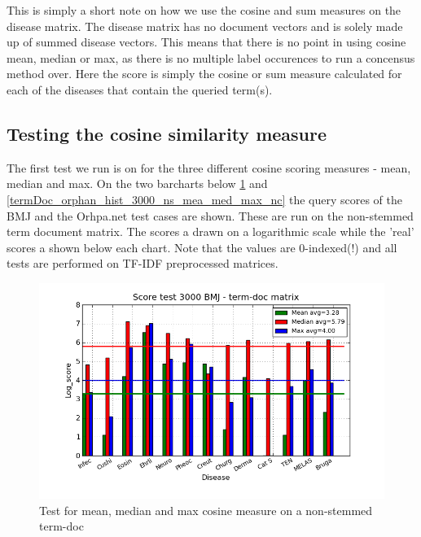 This is simply a short note on how we use the cosine and sum measures
on the disease matrix. The disease matrix has no document vectors and
is solely made up of summed disease vectors. This means that there is
no point in using cosine mean, median or max, as there is no multiple
label occurences to run a concensus method over. Here the score is
simply the cosine or sum measure calculated for each of the diseases
that contain the queried term(s).

\subsection{Testing the cosine similarity measure\label{TestingCosineSimilarity}}

The first test we run is on for the three different cosine scoring measures - mean, 
median and max. On the two barcharts below \ref{termDoc_bmj_hist_3000_ns_mea_med_max_nc} 
and \ref{termDoc_orphan_hist_3000_ns_mea_med_max_nc} the query scores of the BMJ 
and the Orhpa.net test cases are shown. These are run on the non-stemmed term document matrix. 
The scores a drawn on a logarithmic scale while the 'real' scores a shown below each chart. 
Note that the values are 0-indexed(!) and all tests are performed on TF-IDF preprocessed matrices. \\

\begin{figure}[H]
        \begin{center}
          \includegraphics[width=1.0\textwidth]{barcharts/termDoc_bmj_hist_3000_ns_mea_med_max_nc.png}
        \end{center}
        \caption{Test for mean, median and max cosine measure on a non-stemmed term-doc}
        \label{termDoc_bmj_hist_3000_ns_mea_med_max_nc}
\end{figure}

